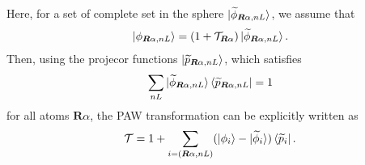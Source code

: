 \documentclass{article}
\begin{document}
Here, for a set of complete set in the sphere $\ket{\widetilde{\phi}_{\bm{R}\alpha, nL}}$, we assume that 
\begin{align}
  \ket{{\phi}_{\bm{R}\alpha, nL}} = (1 + \mathcal{T}_{\bm{R}\alpha}) \ket{\widetilde{\phi}_{\bm{R}\alpha, nL}}.
\end{align}
Then, using the projecor functions $\ket{\widetilde{p}_{\bm{R}\alpha,nL}}$, which satisfies
\begin{align} 
  \sum_{nL} \ket{\widetilde{\phi}_{\bm{R}\alpha, nL}} \bra{\widetilde{p}_{\bm{R}\alpha, nL}} = 1
\end{align}
for all atoms $\bm{R}\alpha$, the PAW transformation can be explicitly written as 
\begin{align}
  \mathcal{T} = 1 + \sum_{i = (\bm{R}\alpha, nL)} (\ket{\phi_i} - \ket{\widetilde{\phi}_i}) \bra{\widetilde{p}_i}.
\end{align}
\end{document}
